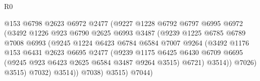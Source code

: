 \begin{lexlean}{R0}
\begin{coremodule}
                                    @153
                                    @6798
                                    @2623
                                    @6972
                                    @2477
                                    (@9227
                                      @1228
                                      @6792
                                      @6797
                                      @6995
                                      @6972
                                      (@3492
                                        @1226
                                        @923
                                        @6790
                                        @2625
                                        @6993
                                        @3487
                                        (@9239
                                          @1225
                                          @6785
                                          @6789
                                          @7008
                                          @6993
                                          (@9245
                                            @1224
                                            @6423
                                            @6784
                                            @6584
                                            @7007
                                            @9264
                                            (@3492
                                              @1176
                                              @153
                                              @6431
                                              @2623
                                              @6695
                                              @2477
                                              (@9239
                                                @1175
                                                @6425
                                                @6430
                                                @6709
                                                @6695
                                                (@9245 @923 @6423 @2625 @6584 @3487 @9264 @3515)
                                                @6721)
                                              @3514))
                                          @7026)
                                        @3515)
                                      @7032)
                                    @3514))
                                @7038)
                              @3515)
                            @7044)

\end{coremodule}
\end{lexlean}
